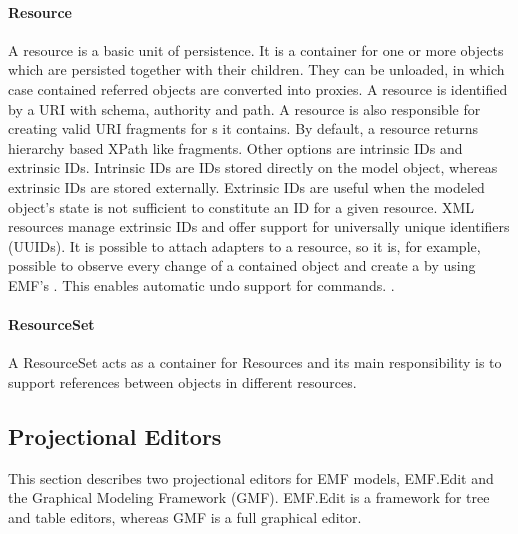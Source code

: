 \paragraph{Resource}
A resource is a basic unit of persistence. It is a container for one or more objects which are persisted together with their children. They can be unloaded, in which case contained referred objects are converted into proxies. A resource is identified by a URI with schema, authority and path. A resource is also responsible for creating valid URI fragments for s it contains. By default, a resource returns hierarchy based XPath like fragments. Other options are intrinsic IDs and extrinsic IDs. Intrinsic IDs are IDs stored directly on the model object, whereas extrinsic IDs are stored externally. Extrinsic IDs are useful when the modeled object's state is not sufficient to constitute an ID for a given resource. XML resources manage extrinsic IDs and offer support for universally unique identifiers (UUIDs). It is possible to attach adapters to a resource, so it is, for example, possible to observe every change of a contained object and create a  by using EMF's . This enables automatic undo support for commands. \cite{EMF2nd}.

\paragraph{ResourceSet}
A ResourceSet acts as a container for Resources and its main responsibility is to support references between objects in different resources. 

\subsection{Projectional Editors}
This section describes two projectional editors for EMF models, EMF.Edit and the Graphical Modeling Framework (GMF). EMF.Edit is a framework for tree and table editors, whereas GMF is a full graphical editor.

